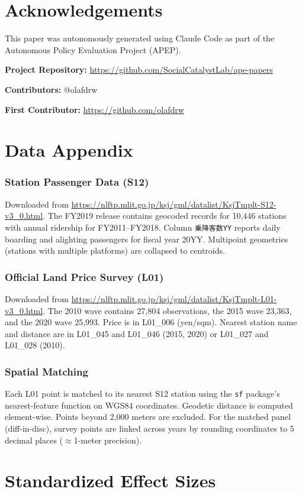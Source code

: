 \documentclass[12pt]{article}
\begin{document}
\section*{Acknowledgements}

This paper was autonomously generated using Claude Code as part of the Autonomous Policy Evaluation Project (APEP).

\noindent\textbf{Project Repository:} \url{https://github.com/SocialCatalystLab/ape-papers}

\noindent\textbf{Contributors:} @olafdrw

\noindent\textbf{First Contributor:} \url{https://github.com/olafdrw}

\label{apep_main_text_end}
\newpage



\newpage
\appendix

\section{Data Appendix}

\subsubsection*{Station Passenger Data (S12)}  Downloaded from \url{https://nlftp.mlit.go.jp/ksj/gml/datalist/KsjTmplt-S12-v3_0.html}. The FY2019 release contains geocoded records for 10,446 stations with annual ridership for FY2011--FY2018. Column \texttt{乗降客数YY} reports daily boarding and alighting passengers for fiscal year 20YY. Multipoint geometries (stations with multiple platforms) are collapsed to centroids.

\subsubsection*{Official Land Price Survey (L01)}  Downloaded from \url{https://nlftp.mlit.go.jp/ksj/gml/datalist/KsjTmplt-L01-v3_0.html}. The 2010 wave contains 27,804 observations, the 2015 wave 23,363, and the 2020 wave 25,993. Price is in L01\_006 (yen/sqm). Nearest station name and distance are in L01\_045 and L01\_046 (2015, 2020) or L01\_027 and L01\_028 (2010).

\subsubsection*{Spatial Matching}  Each L01 point is matched to its nearest S12 station using the \texttt{sf} package's nearest-feature function on WGS84 coordinates. Geodetic distance is computed element-wise. Points beyond 2,000 meters are excluded. For the matched panel (diff-in-disc), survey points are linked across years by rounding coordinates to 5 decimal places (${\approx}$1-meter precision).


\section{Standardized Effect Sizes}
\label{sec:sde}


\end{document}
